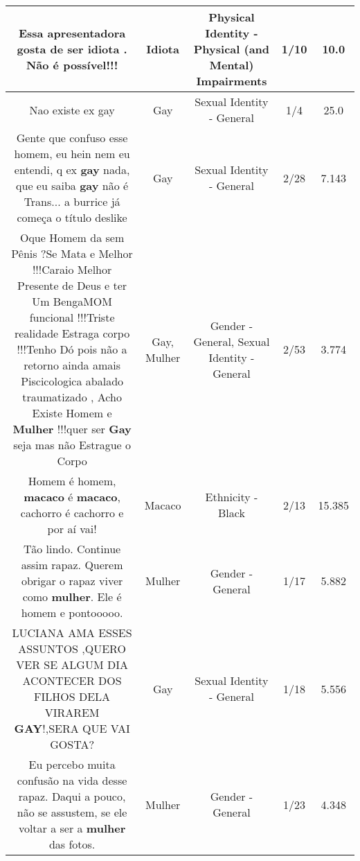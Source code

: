 \documentclass[11pt]{article}
\newlength\mylength
\begin{document}
\begin{center}
\begin{longtable}{|C{.65\mylength}|C{.30\mylength}|C{.12\mylength}|C{.12\mylength}|C{.12\mylength}|}
  \small Essa apresentadora gosta de ser \textbf{idiota} . Não é possível!!!\normalsize   & Idiota & Physical Identity - Physical (and Mental) Impairments & 1/10 & 10.0 \\  \hline
  \small Nao existe  ex  gay\normalsize   & Gay & Sexual Identity - General & 1/4 & 25.0 \\  \hline
  \small Gente que confuso esse homem, eu hein nem eu entendi, q ex \textbf{gay} nada, que eu saiba \textbf{gay} não é Trans... a burrice já começa o título deslike\normalsize   & Gay & Sexual Identity - General & 2/28 & 7.143 \\  \hline
  \small Oque Homem da sem Pênis ?Se Mata e Melhor !!!Caraio Melhor Presente de Deus e ter Um BengaMOM funcional !!!Triste realidade Estraga corpo !!!Tenho Dó pois não a retorno ainda amais Piscicologica abalado traumatizado , Acho Existe Homem e \textbf{Mulher} !!!quer ser \textbf{Gay} seja mas não Estrague o Corpo\normalsize   & Gay, Mulher & Gender - General, Sexual Identity - General & 2/53 & 3.774 \\  \hline
  \small Homem é homem, \textbf{macaco} é \textbf{macaco}, cachorro é cachorro e por aí vai!\normalsize   & Macaco & Ethnicity - Black & 2/13 & 15.385 \\  \hline
  \small Tão lindo. Continue assim rapaz. Querem obrigar o rapaz viver como \textbf{mulher}. Ele é homem e pontooooo.\normalsize   & Mulher & Gender - General & 1/17 & 5.882 \\  \hline
  \small LUCIANA AMA ESSES ASSUNTOS ,QUERO VER SE ALGUM DIA ACONTECER DOS FILHOS DELA VIRAREM \textbf{GAY}!,SERA QUE VAI GOSTA?\normalsize   & Gay & Sexual Identity - General & 1/18 & 5.556 \\  \hline
  \small Eu percebo muita confusão na vida desse rapaz. Daqui a pouco, não se assustem, se ele voltar a ser a \textbf{mulher} das fotos.\normalsize   & Mulher & Gender - General & 1/23 & 4.348 \\  \hline

\end{longtable}
\end{center}
\end{document}
